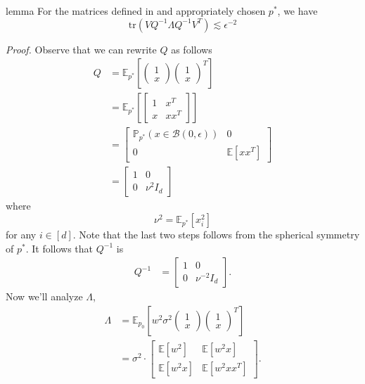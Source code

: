 \documentclass[11pt]{article}
\begin{document}
\begin{restatable}{lemma}{} \label{lemma: trace bound}
    For the matrices defined in  and appropriately chosen $p^*$, we have
    \[\text{tr}(VQ^{-1}\Lambda Q^{-1}V^T) \lesssim \epsilon^{-2} \]
\end{restatable}
\noindent \textit{Proof.} Observe that we can rewrite $Q$ as follows
\begin{align}
    Q &= \mathbb{E}_{p^*}\left[\begin{pmatrix}
        1 \\ x
    \end{pmatrix}\begin{pmatrix}
        1 \\ x
    \end{pmatrix}^T\right] \\
    &= \mathbb{E}_{p^*}\left[
    \begin{bmatrix}
         1 & x^T \\
         x & xx^T
    \end{bmatrix}\right] \\
    &= \begin{bmatrix}
         \mathbb{P}_{p^*}(x \in \mathcal{B}(0, \epsilon)) & 0 \\
         0 & \mathbb{E}\left[xx^T\right]
    \end{bmatrix} \\
    &= \begin{bmatrix}
         1 & 0 \\
         0 & \nu^2I_d
    \end{bmatrix}
\end{align}
where
\[\nu^2 = \mathbb{E}_{p^*}[x_i^2]\]
for any $i \in [d]$. Note that the last two steps follows from the spherical symmetry of $p^*$. It follows that $Q^{-1}$ is
\begin{align}
    Q^{-1} &= \begin{bmatrix}
         1 & 0 \\
         0 & \nu^{-2}I_d
    \end{bmatrix}.
\end{align}
Now we'll analyze $\Lambda$, 
\begin{align}
    \Lambda &= \mathbb{E}_{p_0}\left[w^2\sigma^2\begin{pmatrix}
        1 \\ x
    \end{pmatrix}\begin{pmatrix}
        1 \\ x
    \end{pmatrix}^T\right] \\
    &= 
    \sigma^2\cdot\begin{bmatrix}
         \mathbb{E}[w^2] & \mathbb{E}[w^2x] \\
         \mathbb{E}[w^2x] & \mathbb{E}[w^2xx^T]
    \end{bmatrix}.
\end{align}
\end{document}
